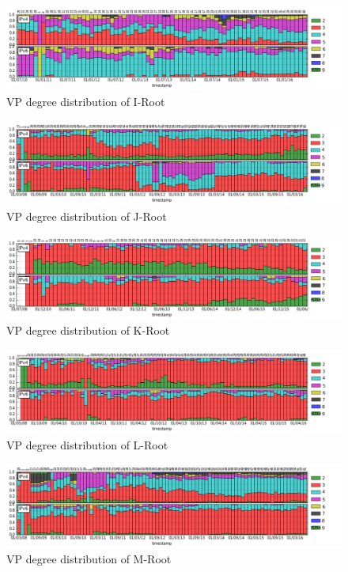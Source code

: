 \begin{appendices}
\begin{figure}
		\centering
		\includegraphics[width=6.5in]{img/peer_degree_diff_i.png}
		\caption{VP degree distribution of I-Root}
		\label{fig:app:peer-deg-dist-diff-i}
	\end{figure}
	\begin{figure}
		\centering
		\includegraphics[width=6.5in]{img/peer_degree_diff_j.png}
		\caption{VP degree distribution of J-Root}
		\label{fig:app:peer-deg-dist-diff-j}
	\end{figure}
	\begin{figure}
		\centering
		\includegraphics[width=6.5in]{img/peer_degree_diff_k.png}
		\caption{VP degree distribution of K-Root}
		\label{fig:app:peer-deg-dist-diff-k}
	\end{figure}
	\begin{figure}
		\centering
		\includegraphics[width=6.5in]{img/peer_degree_diff_l.png}
		\caption{VP degree distribution of L-Root}
		\label{fig:app:peer-deg-dist-diff-l}
	\end{figure}
	\begin{figure}[!htb]
		\centering
		\includegraphics[width=6.5in]{img/peer_degree_diff_m.png}
		\caption{VP degree distribution of M-Root}
		\label{fig:app:peer-deg-dist-diff-m}
	\end{figure}
	

\end{appendices}
